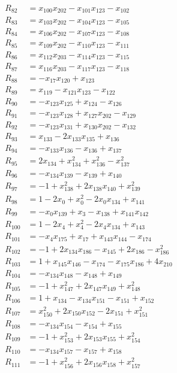 \begin{align*}
R_{82}&=x_{100}x_{202}-x_{101}x_{123}-x_{102}\\
R_{83}&=x_{103}x_{202}-x_{104}x_{123}-x_{105}\\
R_{84}&=x_{106}x_{202}-x_{107}x_{123}-x_{108}\\
R_{85}&=x_{109}x_{202}-x_{110}x_{123}-x_{111}\\
R_{86}&=x_{112}x_{203}-x_{114}x_{123}-x_{115}\\
R_{87}&=x_{116}x_{203}-x_{117}x_{123}-x_{118}\\
R_{88}&=-x_{17}x_{120}+x_{123}\\
R_{89}&=x_{119}-x_{121}x_{123}-x_{122}\\
R_{90}&=-x_{123}x_{125}+x_{124}-x_{126}\\
R_{91}&=-x_{123}x_{128}+x_{127}x_{202}-x_{129}\\
R_{92}&=-x_{123}x_{131}+x_{130}x_{202}-x_{132}\\
R_{93}&=x_{133}-2x_{133}x_{135}+x_{136}\\
R_{94}&=-x_{133}x_{136}-x_{136}+x_{137}\\
R_{95}&=2x_{134}+x_{134}^{2}+x_{136}^{2}-x_{137}^{2}\\
R_{96}&=-x_{134}x_{139}-x_{139}+x_{140}\\
R_{97}&=-1+x_{138}^{2}+2x_{138}x_{140}+x_{139}^{2}\\
R_{98}&=1-2x_{0}+x_{0}^{2}-2x_{0}x_{134}+x_{141}\\
R_{99}&=-x_{0}x_{139}+x_{3}-x_{138}+x_{141}x_{142}\\
R_{100}&=1-2x_{4}+x_{4}^{2}-2x_{4}x_{134}+x_{143}\\
R_{101}&=-x_{4}x_{175}+x_{17}+x_{143}x_{144}-x_{174}\\
R_{102}&=-1+2x_{134}x_{186}-x_{145}+2x_{186}-x_{186}^{2}\\
R_{103}&=1+x_{145}x_{146}-x_{174}-x_{175}x_{186}+4x_{210}\\
R_{104}&=-x_{134}x_{148}-x_{148}+x_{149}\\
R_{105}&=-1+x_{147}^{2}+2x_{147}x_{149}+x_{148}^{2}\\
R_{106}&=1+x_{134}-x_{134}x_{151}-x_{151}+x_{152}\\
R_{107}&=x_{150}^{2}+2x_{150}x_{152}-2x_{151}+x_{151}^{2}\\
R_{108}&=-x_{134}x_{154}-x_{154}+x_{155}\\
R_{109}&=-1+x_{153}^{2}+2x_{153}x_{155}+x_{154}^{2}\\
R_{110}&=-x_{134}x_{157}-x_{157}+x_{158}\\
R_{111}&=-1+x_{156}^{2}+2x_{156}x_{158}+x_{157}^{2}\\

\end{align*}
